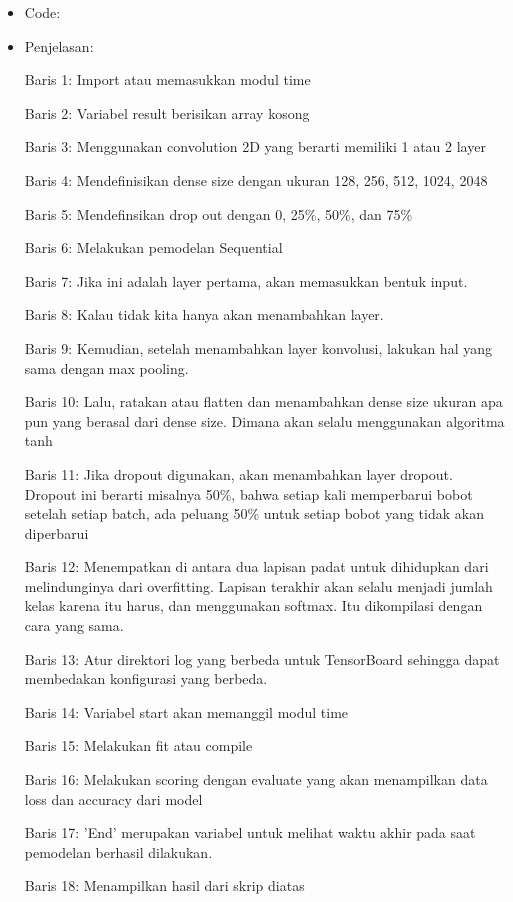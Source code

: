 \begin{itemize}
\item Code:


\item Penjelasan:

Baris 1: Import atau memasukkan modul time

Baris 2: Variabel result berisikan array kosong

Baris 3: Menggunakan convolution 2D yang berarti memiliki 1 atau 2 layer

Baris 4: Mendefinisikan dense size dengan ukuran 128, 256, 512, 1024, 2048

Baris 5: Mendefinsikan drop out dengan 0, 25\%, 50\%, dan 75\%

Baris 6: Melakukan pemodelan Sequential

Baris 7: Jika ini adalah layer pertama, akan memasukkan bentuk input.

Baris 8: Kalau tidak kita hanya akan menambahkan layer.

Baris 9: Kemudian, setelah menambahkan layer konvolusi, lakukan hal yang sama dengan max pooling.

Baris 10: Lalu, ratakan atau flatten dan menambahkan dense size ukuran apa pun yang berasal dari dense size. Dimana akan selalu menggunakan algoritma tanh

Baris 11: Jika dropout digunakan, akan menambahkan layer dropout. Dropout ini berarti misalnya 50\%, bahwa setiap kali memperbarui bobot setelah setiap batch, ada peluang 50\% untuk setiap bobot yang tidak akan diperbarui

Baris 12: Menempatkan di antara dua lapisan padat untuk dihidupkan dari melindunginya dari overfitting. Lapisan terakhir akan selalu menjadi jumlah kelas karena itu harus, dan menggunakan softmax. Itu dikompilasi dengan cara yang sama.

Baris 13: Atur direktori log yang berbeda untuk TensorBoard sehingga dapat membedakan konfigurasi yang berbeda.

Baris 14: Variabel start akan memanggil modul time

Baris 15: Melakukan fit atau compile

Baris 16: Melakukan scoring dengan evaluate yang akan menampilkan data loss dan accuracy dari model

Baris 17: 'End' merupakan variabel untuk melihat waktu akhir pada saat pemodelan berhasil dilakukan.

Baris 18: Menampilkan hasil dari skrip diatas


\end{itemize}
